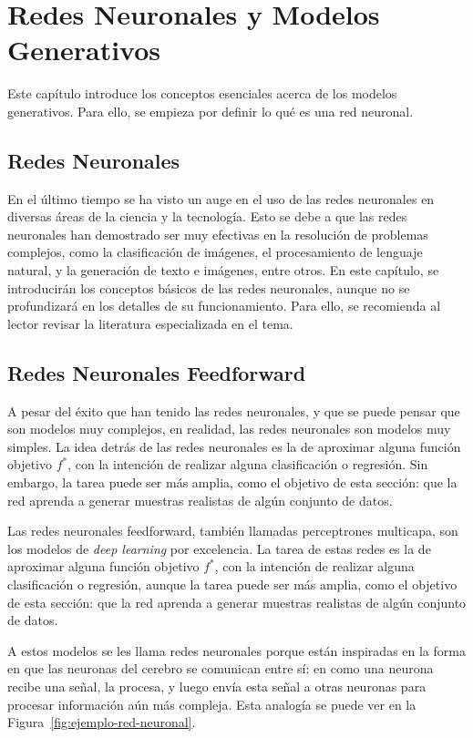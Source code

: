 \chapter{Redes Neuronales y Modelos Generativos}\label{chap:redes-neuronales-y-modelos-generativos}
{
Este capítulo introduce los conceptos esenciales acerca de los modelos generativos. Para ello, se empieza por definir lo qué es una red neuronal.
\section{Redes Neuronales}\label{sec:redes-Neuronales}
{
En el último tiempo se ha visto un auge en el uso de las redes neuronales en diversas áreas de la ciencia y la tecnología. Esto se debe a que las redes neuronales han demostrado ser muy efectivas en la resolución de problemas complejos, como la clasificación de imágenes, el procesamiento de lenguaje natural, y la generación de texto e imágenes, entre otros. En este capítulo, se introducirán los conceptos básicos de las redes neuronales, aunque no se profundizará en los detalles de su funcionamiento. Para ello, se recomienda al lector revisar la literatura especializada en el tema.

\section{Redes Neuronales Feedforward}\label{sec:redes-neuronales-feedforward}
{
    A pesar del éxito que han tenido las redes neuronales, y que se puede pensar que son modelos muy complejos, en realidad, las redes neuronales son modelos muy simples. La idea detrás de las redes neuronales es la de aproximar alguna función objetivo $f^\ast$, con la intención de realizar alguna clasificación o regresión. Sin embargo, la tarea puede ser más amplia, como el objetivo de esta sección: que la red aprenda a generar muestras realistas de algún conjunto de datos.


}



Las redes neuronales feedforward, también llamadas perceptrones multicapa, son los modelos de \textit{deep learning} por excelencia. La tarea de estas redes es la de aproximar alguna función objetivo $f^\ast$, con la intención de realizar alguna clasificación o regresión, aunque la tarea puede ser más amplia, como el objetivo de esta sección: que la red aprenda a generar muestras realistas de algún conjunto de datos.

A estos modelos se les llama redes neuronales porque están inspiradas en la forma en que las neuronas del cerebro se comunican entre sí: en como una neurona recibe una señal, la procesa, y luego envía esta señal a otras neuronas para procesar información aún más compleja. Esta analogía se puede ver en la Figura~\ref{fig:ejemplo-red-neuronal}.

}}
